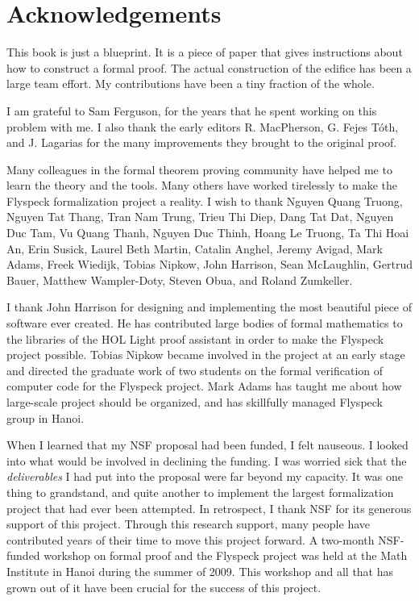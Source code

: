 \section*{Acknowledgements}

This book is just a blueprint.  It is a piece of paper that gives instructions
about how to construct a formal proof.  The actual construction of the edifice
has been a large team effort.  My contributions have been a tiny fraction of the whole.

I am grateful to Sam Ferguson, for the years that
he spent working on this problem with me.  I also thank the early editors
R. MacPherson, G. Fejes T\'oth, and J. Lagarias for the many improvements
they brought to the original proof.

Many colleagues in the formal theorem proving community have helped me
to learn the theory and the tools.  Many others have worked tirelessly
 to make the Flyspeck formalization project a reality.  I wish to thank
Nguyen Quang Truong, %
Nguyen Tat Thang, %
Tran Nam Trung,
Trieu Thi Diep, Dang Tat Dat, Nguyen Duc Tam, Vu Quang Thanh, Nguyen
Duc Thinh, Hoang Le Truong, Ta Thi Hoai An, Erin Susick, Laurel Beth Martin, Catalin
Anghel, Jeremy Avigad, Mark Adams, Freek Wiedijk, Tobias Nipkow, John
Harrison, Sean McLaughlin, Gertrud Bauer, Matthew Wampler-Doty, Steven
Obua, and Roland Zumkeller. 

 I thank John Harrison for designing and implementing the most beautiful piece of
 software ever created.  He has contributed large bodies of formal mathematics to
the libraries of the HOL Light proof assistant in order to make the Flyspeck project
possible.   Tobias Nipkow became involved in the project at an early stage and
directed the graduate work of two students on the formal verification of computer
code for the Flyspeck project. Mark Adams has taught me about how
 large-scale project should be organized, and has skillfully managed 
  Flyspeck group in Hanoi.

  When I learned that my NSF proposal had been funded, I felt
  nauseous.  I looked into what would be involved in declining the
  funding.  I was  worried sick that the {\it deliverables} I had put
  into the proposal were far beyond my capacity.  It was one thing to
  grandstand, and quite another to implement the largest
  formalization project that had ever been attempted.  In retrospect, I
  thank NSF for its generous support of this project.  Through this
  research support, many people have contributed years of their time to move this
  project forward.  A two-month NSF-funded workshop on formal proof
  and the Flyspeck project was held at the Math Institute in Hanoi during the summer of
  2009.  This workshop and all that has grown out of it have been crucial for
  the success of this project.


